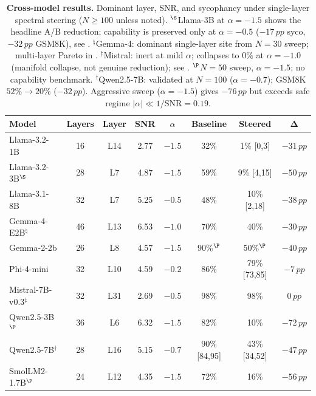 \documentclass{article}
\newcommand{\pp}{\,pp}
\begin{document}
\begin{table}[h]
\centering
\small
\setlength{\tabcolsep}{5pt}
\caption{\textbf{Cross-model results.} Dominant layer, SNR, and
sycophancy under single-layer spectral steering ($N{\ge}100$ unless noted).
$^\S$Llama-3B at $\alpha{=}{-}1.5$ shows the headline A/B reduction; capability
is preserved only at $\alpha{=}{-}0.5$ ($-17\pp$ syco, $-32\pp$ GSM8K), see .
$^\natural$Gemma-4: dominant single-layer site from $N{=}30$ sweep; multi-layer Pareto in .
$^\ddagger$Mistral: inert at mild $\alpha$; collapses to $0\%$ at $\alpha{=}{-}1.0$ (manifold collapse, not genuine reduction); see .
$^\P$$N{=}50$ sweep, $\alpha{=}{-}1.5$; no capability benchmark.
$^\dagger$Qwen2.5-7B: validated at $N{=}100$ ($\alpha{=}{-}0.7$); GSM8K $52\%{\to}20\%$ ($-32\pp$). Aggressive sweep ($\alpha{=}{-}1.5$) gives $-76\pp$ but exceeds safe regime $|\alpha|\ll 1/\mathrm{SNR}{=}0.19$.}
\label{tab:summary}
\begin{tabular}{lccccccc}
\toprule
\textbf{Model} & \textbf{Layers} & \textbf{Layer} & \textbf{SNR} &
 $\alpha$ & \textbf{Baseline} & \textbf{Steered} &
 $\boldsymbol{\Delta}$ \\
\midrule
Llama-3.2-1B & 16 & L14 & 2.77 & $-1.5$ & 32\% & 1\% [0,3] & $-31\pp$ \\
Llama-3.2-3B$^\S$ & 28 & L7 & 4.87 & $-1.5$ & 59\% & 9\% [4,15] & $-50\pp$ \\
Llama-3.1-8B & 32 & L7 & 5.25 & $-0.5$ & 48\% & 10\% [2,18] & $-38\pp$ \\
Gemma-4-E2B$^\natural$ & 46 & L13 & 6.53 & $-1.0$ & 70\% & 40\% & $-30\pp$ \\
Gemma-2-2b & 26 & L8 & 4.57 & $-1.5$ & 90\%$^\P$ & 50\%$^\P$ & $-40\pp$ \\
Phi-4-mini & 32 & L10 & 4.59 & $-0.2$ & 86\% & 79\% [73,85] & $-7\pp$ \\
Mistral-7B-v0.3$^\ddagger$ & 32 & L31 & 2.69 & $-0.5$ & 98\% & 98\% & $0\pp$ \\
\midrule
Qwen2.5-3B$^\P$ & 36 & L6 & 6.32 & $-1.5$ & 82\% & 10\% & $-72\pp$ \\
Qwen2.5-7B$^\dagger$ & 28 & L16 & 5.15 & $-0.7$ & 90\% [84,95] & 43\% [34,52] & $-47\pp$ \\
SmolLM2-1.7B$^\P$ & 24 & L12 & 4.35 & $-1.5$ & 72\% & 16\% & $-56\pp$ \\
\bottomrule
\end{tabular}
\end{table}
\end{document}
